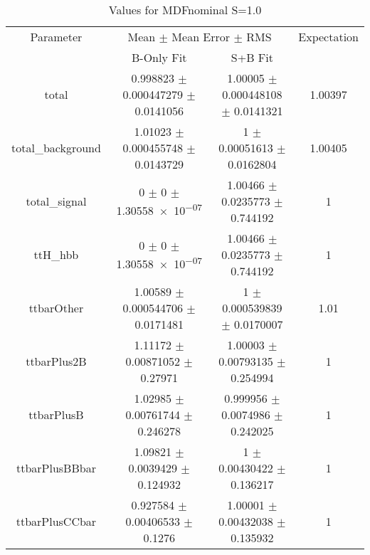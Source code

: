 \begin{table}
\centering
\caption{Values for MDFnominal S=1.0}
\begin{tabular}{cccc}
\toprule
Parameter & \multicolumn{2}{c}{Mean $\pm$ Mean Error $\pm$ RMS} & Expectation\\
 & B-Only Fit & S+B Fit & \\
\midrule
total & \num{0.998823} $\pm$ \num{0.000447279} $\pm$ \num{0.0141056} & \num{1.00005} $\pm$ \num{0.000448108} $\pm$ \num{0.0141321} & \num{1.00397}\\
total\_background & \num{1.01023} $\pm$ \num{0.000455748} $\pm$ \num{0.0143729} & \num{1} $\pm$ \num{0.00051613} $\pm$ \num{0.0162804} & \num{1.00405}\\
total\_signal & \num{0} $\pm$ \num{0} $\pm$ \num{1.30558e-07} & \num{1.00466} $\pm$ \num{0.0235773} $\pm$ \num{0.744192} & \num{1}\\
ttH\_hbb & \num{0} $\pm$ \num{0} $\pm$ \num{1.30558e-07} & \num{1.00466} $\pm$ \num{0.0235773} $\pm$ \num{0.744192} & \num{1}\\
ttbarOther & \num{1.00589} $\pm$ \num{0.000544706} $\pm$ \num{0.0171481} & \num{1} $\pm$ \num{0.000539839} $\pm$ \num{0.0170007} & \num{1.01}\\
ttbarPlus2B & \num{1.11172} $\pm$ \num{0.00871052} $\pm$ \num{0.27971} & \num{1.00003} $\pm$ \num{0.00793135} $\pm$ \num{0.254994} & \num{1}\\
ttbarPlusB & \num{1.02985} $\pm$ \num{0.00761744} $\pm$ \num{0.246278} & \num{0.999956} $\pm$ \num{0.0074986} $\pm$ \num{0.242025} & \num{1}\\
ttbarPlusBBbar & \num{1.09821} $\pm$ \num{0.0039429} $\pm$ \num{0.124932} & \num{1} $\pm$ \num{0.00430422} $\pm$ \num{0.136217} & \num{1}\\
ttbarPlusCCbar & \num{0.927584} $\pm$ \num{0.00406533} $\pm$ \num{0.1276} & \num{1.00001} $\pm$ \num{0.00432038} $\pm$ \num{0.135932} & \num{1}\\
\bottomrule
\end{tabular}
\end{table}